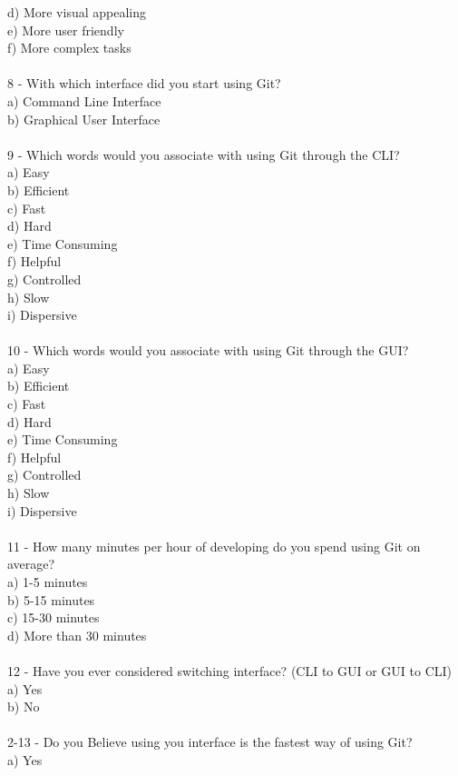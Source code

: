 \documentclass[]{report}
\begin{document}
	d) More visual appealing\\
	e) More user friendly\\
	f) More complex tasks\\\\
	8 - With which interface did you start using Git?\\
	a) Command Line Interface\\
	b) Graphical User Interface\\\\
	9 - Which words would you associate with using Git through the CLI?\\
	a) Easy\\
	b) Efficient\\
	c) Fast\\
	d) Hard\\
	e) Time Consuming\\
	f) Helpful\\
	g) Controlled\\
	h) Slow\\
	i) Dispersive\\\\
	10 - Which words would you associate with using Git through the GUI?\\
	a) Easy\\
	b) Efficient\\
	c) Fast\\
	d) Hard\\
	e) Time Consuming\\
	f) Helpful\\
	g) Controlled\\
	h) Slow\\
	i) Dispersive\\\\
	11 - How many minutes per hour of developing do you spend using Git on average?\\
	a) 1-5 minutes\\
	b) 5-15 minutes\\
	c) 15-30 minutes\\
	d) More than 30 minutes\\\\
	12 - Have you ever considered switching interface? (CLI to GUI or GUI to CLI)\\
	a) Yes\\
	b) No\\\\
	2-13 - Do you Believe using you interface is the fastest way of using Git?\\
	a) Yes\\
\end{document}
